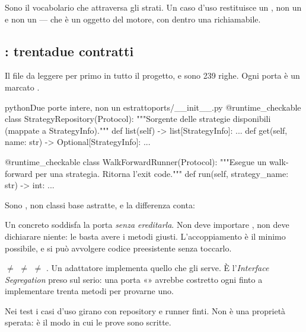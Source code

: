 Sono il vocabolario che attraversa gli strati. Un caso d'uso restituisce un
, non un  e non un
 --- che è un oggetto del motore, con dentro una
 richiamabile.

\subsection{\pkgPorte: trentadue contratti}

Il file da leggere per primo in tutto il progetto, e sono
\num{239} righe. Ogni porta è un  marcato
.

\begin{codiceInterno}{python}{Due porte intere, non un estratto}{ports/\_\_init\_\_.py}
@runtime_checkable
class StrategyRepository(Protocol):
    """Sorgente delle strategie disponibili (mappate a StrategyInfo)."""
    def list(self) -> list[StrategyInfo]: ...
    def get(self, name: str) -> Optional[StrategyInfo]: ...


@runtime_checkable
class WalkForwardRunner(Protocol):
    """Esegue un walk-forward per una strategia. Ritorna l'exit code."""
    def run(self, strategy_name: str) -> int: ...
\end{codiceInterno}

\noindent
Sono , non classi base astratte, e la differenza conta:

\begin{description}[leftmargin = 1.6em, style = nextline, itemsep = 4pt]
  \item[Tipizzazione strutturale] Un concreto soddisfa la porta
    \emph{senza ereditarla}. Non deve importare \pkgPorte, non deve
    dichiarare niente: le basta avere i metodi giusti. L'accoppiamento è il
    minimo possibile, e si può avvolgere codice preesistente senza
    toccarlo.
  \item[Porte piccole e separate]  $\neq$
     $\neq$  $\neq$
    . Un adattatore implementa quello che gli serve. È
    l'\emph{Interface Segregation} preso sul serio: una porta
    «» avrebbe costretto ogni finto a implementare
    trenta metodi per provarne uno.
  \item[Sostituibilità verificata] Nei test i casi d'uso girano con
    repository e runner finti. Non è una proprietà sperata: è il modo in cui
    le prove sono scritte.
\end{description}

